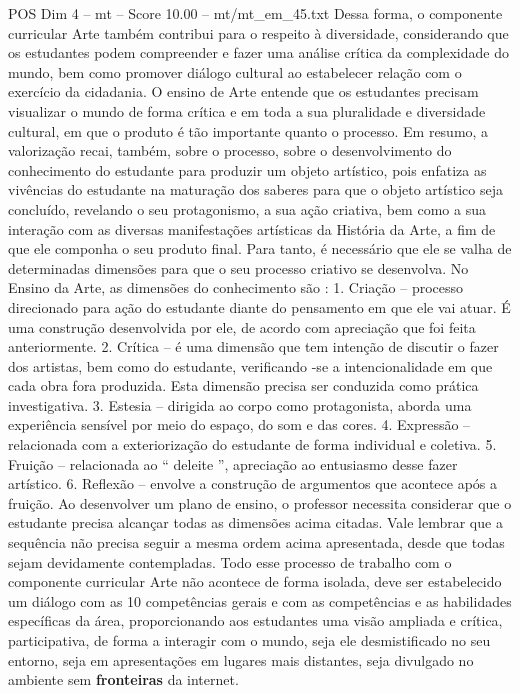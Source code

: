 \begin{textsample}{POS Dim 4 – mt – Score 10.00 – mt/mt\_em\_45.txt}
Dessa forma, o componente curricular Arte também contribui para o respeito à diversidade, considerando que os estudantes podem compreender e fazer uma análise crítica da complexidade do mundo, bem como promover diálogo cultural ao estabelecer relação com o exercício da cidadania.
O ensino de Arte entende que os estudantes precisam visualizar o mundo de forma crítica e em toda a sua pluralidade e diversidade cultural, em que o produto é tão importante quanto o processo.
Em resumo, a valorização recai, também, sobre o processo, sobre o desenvolvimento do conhecimento do estudante para produzir um objeto artístico, pois enfatiza as vivências do estudante na maturação dos saberes para que o objeto artístico seja concluído, revelando o seu protagonismo, a sua ação criativa, bem como a sua interação com as diversas manifestações artísticas da História da Arte, a fim de que ele componha o seu produto final.
Para tanto, é necessário que ele se valha de determinadas dimensões para que o seu processo criativo se desenvolva.
No Ensino da Arte, as dimensões do conhecimento são : 1.
Criação – processo direcionado para ação do estudante diante do pensamento em que ele vai atuar.
É uma construção desenvolvida por ele, de acordo com apreciação que foi feita anteriormente. 2.
Crítica – é uma dimensão que tem intenção de discutir o fazer dos artistas, bem como do estudante, verificando -se a intencionalidade em que cada obra fora produzida.
Esta dimensão precisa ser conduzida como prática investigativa. 3.
Estesia – dirigida ao corpo como protagonista, aborda uma experiência sensível por meio do espaço, do som e das cores. 4.
Expressão – relacionada com a exteriorização do estudante de forma individual e coletiva. 5.
Fruição – relacionada ao “ deleite ”, apreciação ao entusiasmo desse fazer artístico. 6.
Reflexão – envolve a construção de argumentos que acontece após a fruição.
Ao desenvolver um plano de ensino, o professor necessita considerar que o estudante precisa alcançar todas as dimensões acima citadas.
Vale lembrar que a sequência não precisa seguir a mesma ordem acima apresentada, desde que todas sejam devidamente contempladas.
Todo esse processo de trabalho com o componente curricular Arte não acontece de forma isolada, deve ser estabelecido um diálogo com as 10 competências gerais e com as competências e as habilidades específicas da área, proporcionando aos estudantes uma visão ampliada e crítica, participativa, de forma a interagir com o mundo, seja ele desmistificado no seu entorno, seja em apresentações em lugares mais distantes, seja divulgado no ambiente sem \textbf{fronteiras} da internet.

\end{textsample}
